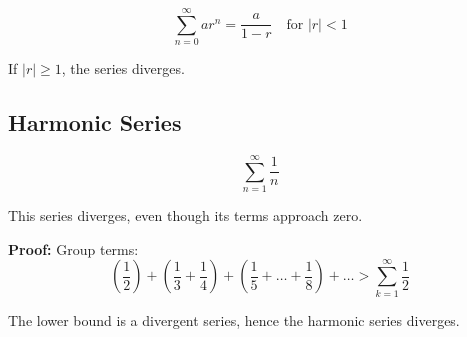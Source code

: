 \[
\sum_{n=0}^\infty ar^n = \frac{a}{1 - r} \quad \text{for } |r| < 1
\]

If \(|r| \ge 1\), the series diverges.

\subsection{Harmonic Series}

\[
\sum_{n=1}^{\infty} \frac{1}{n}
\]

This series diverges, even though its terms approach zero.

\textbf{Proof:} Group terms:
\[
\left(\frac{1}{2}\right) + \left(\frac{1}{3} + \frac{1}{4}\right) + \left(\frac{1}{5} + \dots + \frac{1}{8}\right) + \dots > \sum_{k=1}^\infty \frac{1}{2}
\]

The lower bound is a divergent series, hence the harmonic series diverges.

\newpage